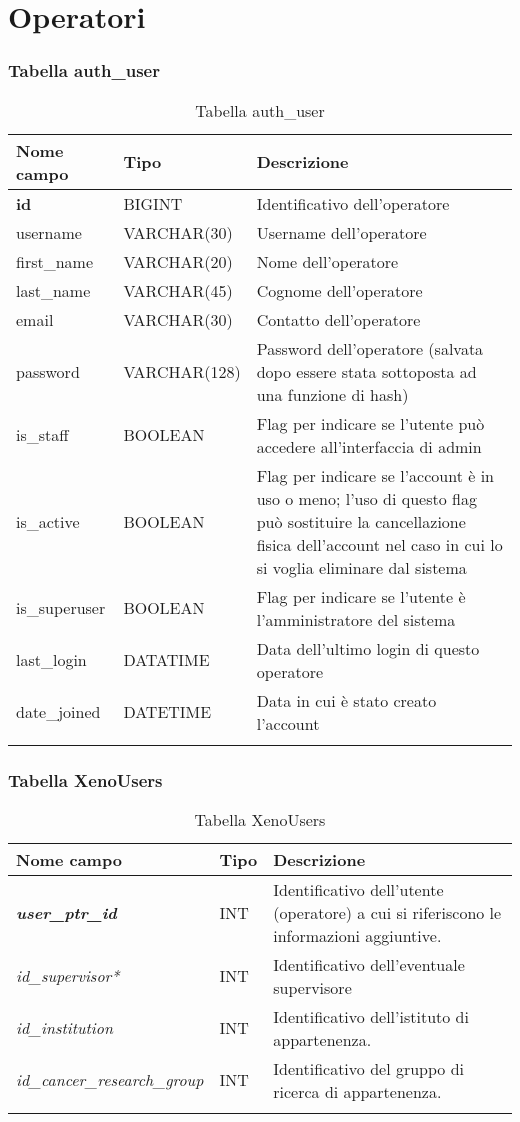 \section{Operatori}

\subsubsection{Tabella auth\_user}

\begin{longtable}{|l|l|p{6.5cm}|}
\hline
\textbf{Nome campo} &	\textbf{Tipo} &	\textbf{Descrizione}\\ \hline
\textbf{id} &	BIGINT &	Identificativo dell'operatore\\ \hline
username &	VARCHAR(30) &	Username dell'operatore\\ \hline
first\_name &	VARCHAR(20) &	Nome dell'operatore\\ \hline
last\_name &	VARCHAR(45) &	Cognome dell'operatore\\ \hline
email &	VARCHAR(30) &	Contatto dell'operatore\\ \hline
password &	VARCHAR(128) &	Password dell'operatore (salvata dopo essere stata sottoposta ad una funzione di hash)\\ \hline
is\_staff & BOOLEAN & Flag per indicare se l'utente pu\`o accedere all'interfaccia di admin\\ \hline
is\_active & BOOLEAN & Flag per indicare se l'account \`e in uso o meno; l'uso di questo flag pu\`o sostituire la cancellazione fisica dell'account nel caso in cui lo si voglia eliminare dal sistema\\ \hline
is\_superuser & BOOLEAN & Flag per indicare se l'utente \`e l'amministratore del sistema\\ \hline
last\_login & DATATIME & Data dell'ultimo login di questo operatore\\ \hline
date\_joined & DATETIME & Data in cui \`e stato creato l'account\\ \hline
\caption{Tabella auth\_user}
\end{longtable}

\subsubsection{Tabella XenoUsers }

\begin{longtable}{|l|l|p{6.5cm}|}
\hline
\textbf{Nome campo} &	\textbf{Tipo} &	\textbf{Descrizione}\\ \hline
\textit{\textbf{user\_ptr\_id}}  &	INT &	Identificativo dell'utente (operatore) a cui si riferiscono le informazioni aggiuntive.\\ \hline
\textit{id\_supervisor*} &	 INT &	Identificativo dell'eventuale supervisore\\ \hline
\textit{id\_institution} &	INT &	Identificativo dell'istituto di appartenenza.\\ \hline
\textit{id\_cancer\_research\_group} &	INT &	Identificativo del gruppo di ricerca di appartenenza.\\ \hline
\caption{Tabella XenoUsers}
\end{longtable}

